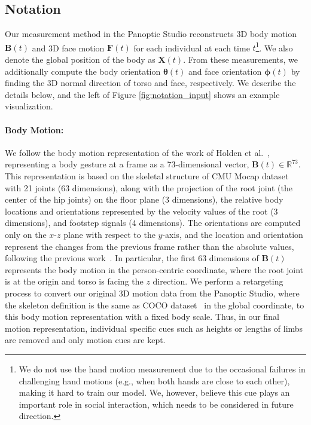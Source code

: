 \subsection{Notation}
Our measurement method in the Panoptic Studio reconstructs 3D body motion $\mathbf{B}(t)$ and 3D face motion $\mathbf{F}(t)$ for each individual at each time $t$\footnote{We do not use the hand motion measurement due to the occasional failures in challenging hand motions (e.g., when both hands are close to each other), making it hard to train our model. We, however, believe this cue plays an important role in social interaction, which needs to be considered in future direction.}. We also denote the global position of the body as $\mathbf{X}(t)$. From these measurements, we additionally compute the body orientation $\boldsymbol{\theta}(t)$ and face orientation $\boldsymbol{\phi}(t)$ by finding the 3D normal direction of torso and face, respectively. We describe the details below, and the left of Figure \ref{fig:notation_input} shows an example visualization.

\paragraph{Body Motion:} We follow the body motion representation of the work of Holden et al.~\cite{holden2016deep}, representing a body gesture at a frame as a 73-dimensional vector, $\mathbf{B}(t) \in \mathbb{R}^{73}$. This representation is based on the skeletal structure of CMU Mocap dataset~\cite{gross2001cmu} with 21 joints (63 dimensions), along with the projection of the root joint (the center of the hip joints) on the floor plane (3 dimensions), the relative body locations and orientations represented by the velocity values of the root (3 dimensions), and footstep signals (4 dimensions). The orientations are computed only on the $x$-$z$ plane with respect to the $y$-axis, and the location and orientation represent the changes from the previous frame rather than the absolute values, following the previous work~\cite{jain2016structural, holden2016deep}. In particular, the first 63 dimensions of $\mathbf{B}(t)$ represents the body motion in the person-centric coordinate, where the root joint is at the origin and torso is facing the $z$ direction. We perform a retargeting process to convert our original 3D motion data from the Panoptic Studio, where the skeleton definition is the same as COCO dataset~\cite{coco-14} in the global coordinate, to this body motion representation with a fixed body scale. Thus, in our final motion representation, individual specific cues such as heights or lengths of limbs are removed and only motion cues are kept.

